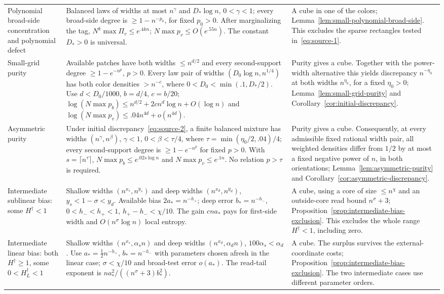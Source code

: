 \begin{longtable}{@{}>{\raggedright\arraybackslash}p{.255\linewidth}>{\raggedright\arraybackslash}p{.355\linewidth}>{\raggedright\arraybackslash}p{.345\linewidth}@{}}
Polynomial broad-side concentration and polynomial defect &
Balanced laws of widths at most $n^\gamma$ and $D_*\log n$, $0<\gamma<1$;
every broad-side degree is $\ge1-n^{-p_0}$, for fixed $p_0>0$.
After marginalizing the tag, $N^k\max\Pi_v\le e^{.4kn}$;
$N\max p_v\le O(e^{.55n})$. The constant $D_*>0$ is universal. &
A cube in one of the colors;
Lemma~\ref{lem:small-polynomial-broad-side}. This excludes the sparse
rectangles tested in~\eqref{eq:source-1}.\\

Small-grid purity &
Available patches have both widths $\le n^{d/2}$ and every second-support
degree $\ge1-e^{-n^p}$, $p>0$. Every law pair of widths
$(D_0\log n,n^{1/4})$ has both color densities $>n^{-c}$, where
$0<D_0<\min(.1,D_*/2)$.
Use $d<D_0/1000$, $b=d/4$, $c=b/20$;
$\log(N\max p_b)\le n^{d/2}+2cn^d\log n+O(\log n)$ and
$\log(N\max p_v)\le .04n^{4d}+o(n^{4d})$. &
Purity gives a cube. Together with the power-width alternative this yields
discrepancy $n^{-\eta_0}$ at both widths $n^{\eta_0}$, for a fixed
$\eta_0>0$; Lemma~\ref{lem:small-grid-purity} and
Corollary~\ref{cor:initial-discrepancy}.\\

Asymmetric purity &
Under initial discrepancy~\eqref{eq:source-2}, a finite balanced
mixture has widths $(n^\gamma,n^\beta)$, $\gamma<1$, $0<\beta<\tau/4$, where $\tau=\min(\eta_0/2,.04)/4$;
every second-support degree is $\ge1-e^{-n^p}$ for fixed $p>0$.
With $s=\lceil n^\tau\rceil$, $N\max p_b\le e^{.02s\log n}$
and $N\max p_v\le e^{.1n}$.
No relation $p>\tau$ is required. &
Purity gives a cube. Consequently, at every admissible fixed rational
width pair, all weighted densities differ from $1/2$ by at most a fixed
negative power of $n$, in both orientations;
Lemma~\ref{lem:asymmetric-purity} and
Corollary~\ref{cor:asymmetric-discrepancy}.\\

Intermediate sublinear bias: some $H^\dagger<1$ &
Shallow widths $(n^{x_s},n^{y_s})$ and deep widths
$(n^{x_d},n^{y_d})$, $y_s<1-\sigma<y_d$.
Available bias $2a_*=n^{-h_+}$; deep error $b_*=n^{-h_-}$,
$0<h_-<h_+<1$, $h_+-h_-<\chi/10$.
The gain $cna_*$ pays for first-side width and
$O(n^\sigma\log n)$ local entropy. &
A cube, using a core of size $\le n^\chi$ and an outside-core read bound
$n^\sigma+3$; Proposition~\ref{prop:intermediate-bias-exclusion}.
This excludes the whole range $H^\dagger<1$, including zero.\\

Intermediate linear bias: both $H^\dagger\ge1$, some
$0<H_L^\dagger<1$ &
Shallow widths $(n^{x_s},\alpha_s n)$ and deep widths
$(n^{x_d},\alpha_d n)$, $100\alpha_s<\alpha_d$.
Use $a_*=\tfrac12n^{-h_+}$, $b_*=n^{-h_-}$ with parameters chosen
afresh in the linear case; $\sigma<\chi/10$ and broad-test error
$o(a_*)$. The read-tail exponent is
$na_*^2/((n^\sigma+3)b_*^2)$. &
A cube. The surplus survives the external-coordinate costs;
Proposition~\ref{prop:intermediate-bias-exclusion}.
The two intermediate cases use different parameter orders.\\


\end{longtable}
